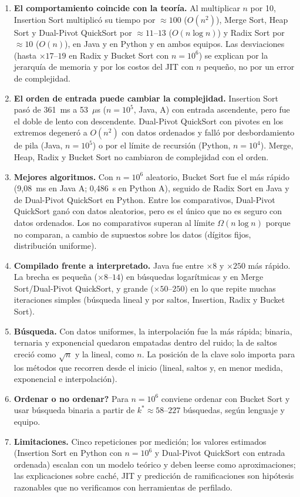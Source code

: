 \documentclass[11pt,a4paper]{article}
\begin{document}
\begin{enumerate}
  \item \textbf{El comportamiento coincide con la teor\'ia.} Al multiplicar $n$ por 10, Insertion Sort multiplic\'o
  su tiempo por $\approx100$ ($O(n^2)$), Merge Sort, Heap Sort y Dual-Pivot QuickSort por $\approx11$--$13$
  ($O(n\log n)$) y Radix Sort por $\approx10$ ($O(n)$), en Java y en Python y en ambos equipos. Las
  desviaciones (hasta $\times17$--$19$ en Radix y Bucket Sort con $n=10^6$) se explican por la jerarqu\'ia de
  memoria y por los costos del JIT con $n$ peque\~no, no por un error de complejidad.
  \item \textbf{El orden de entrada puede cambiar la complejidad.} Insertion Sort pas\'o de 361~ms a 53~$\mu$s
  ($n=10^5$, Java, A) con entrada ascendente, pero fue el doble de lento con descendente. Dual-Pivot QuickSort
  con pivotes en los extremos degener\'o a $O(n^2)$ con datos ordenados y fall\'o por desbordamiento de pila
  (Java, $n=10^5$) o por el l\'imite de recursi\'on (Python, $n=10^4$). Merge, Heap, Radix y Bucket Sort no
  cambiaron de complejidad con el orden.
  \item \textbf{Mejores algoritmos.} Con $n=10^6$ aleatorio, Bucket Sort fue el m\'as r\'apido (9,08~ms en Java A;
  0,486~s en Python A), seguido de Radix Sort en Java y de Dual-Pivot QuickSort en Python. Entre los comparativos,
  Dual-Pivot QuickSort gan\'o con datos aleatorios, pero es el \'unico que no es seguro con datos ordenados. Los no
  comparativos superan al l\'imite $\Omega(n\log n)$ porque no comparan, a cambio de supuestos sobre los datos
  (d\'igitos fijos, distribuci\'on uniforme).
  \item \textbf{Compilado frente a interpretado.} Java fue entre $\times8$ y $\times250$ m\'as r\'apido. La
  brecha es peque\~na ($\times8$--$14$) en b\'usquedas logar\'itmicas y en Merge Sort/Dual-Pivot QuickSort, y
  grande ($\times50$--$250$) en lo que repite muchas iteraciones simples (b\'usqueda lineal y por saltos,
  Insertion, Radix y Bucket Sort).
  \item \textbf{B\'usqueda.} Con datos uniformes, la interpolaci\'on fue la m\'as r\'apida; binaria, ternaria y
  exponencial quedaron empatadas dentro del ruido; la de saltos creci\'o como $\sqrt n$ y la lineal, como $n$. La
  posici\'on de la clave solo importa para los m\'etodos que recorren desde el inicio (lineal, saltos y, en
  menor medida, exponencial e interpolaci\'on).
  \item \textbf{\textquestiondown Ordenar o no ordenar?} Para $n=10^6$ conviene ordenar con Bucket Sort y usar
  b\'usqueda binaria a partir de $k^*\approx58$--$227$ b\'usquedas, seg\'un lenguaje y equipo.
  \item \textbf{Limitaciones.} Cinco repeticiones por medici\'on; los valores estimados (Insertion Sort en Python
  con $n=10^6$ y Dual-Pivot QuickSort con entrada ordenada) escalan con un modelo te\'orico y deben leerse como
  aproximaciones; las explicaciones sobre cach\'e, JIT y predicci\'on de ramificaciones son hip\'otesis razonables
  que no verificamos con herramientas de perfilado.
\end{enumerate}
\end{document}
